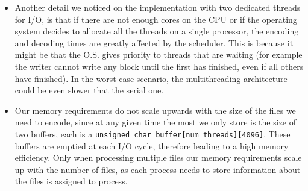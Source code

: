 \begin{itemize}
\item Another detail we noticed on the implementation with two dedicated threads for I/O, is that if there are not enough cores on the CPU or if the operating system decides to allocate all the threads on a single processor, the encoding and decoding times are greatly affected by the scheduler. This is because it might be that the O.S. gives priority to threads that are waiting (for example the writer cannot write any block until the first has finished, even if all others have finished). In the worst case scenario, the multithreading architecture could be even slower that the serial one.

\item Our memory requirements do not scale upwards with the size of the files we need to encode, since at any given time the most we only store is the size of two buffers, each is a \verb|unsigned char buffer[num_threads][4096]|. These buffers are emptied at each I/O cycle, therefore leading to a high memory efficiency. Only when processing multiple files our memory requirements scale up with the number of files, as each process needs to store information about the files is assigned to process.

\end{itemize}

